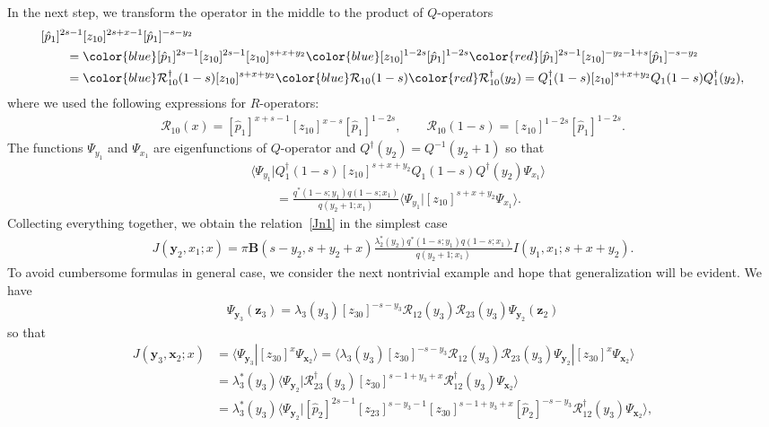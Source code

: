 \documentclass[10pt,a4paper]{amsart}
\newcommand{\blue}{\color{blue}}
\newcommand{\red}{\color{red}}
\numberwithin{equation}{section}
\begin{document}
In the next step, we transform the operator in the middle to
the product of $Q$-operators
\begin{align*}
&
[\hat{p}_1]^{2s-1} [z_{10}]^{2s+x-1}
[\hat{p}_1]^{-s-y_2} \\
&
\qquad{}= {\blue[\hat{p}_1]^{2s-1} [z_{10}]^{2s-1}}
[z_{10}]^{s+x+y_2}
{\blue [z_{10}]^{1-2s} [\hat{p}_1]^{1-2s}}
{\red[\hat{p}_1]^{2s-1} [z_{10}]^{-y_2-1+s}
[\hat{p}_1]^{-s-y_2}} \\
&
\qquad{}= {\blue \mathcal{R}^{\dagger}_{10}(1-s)}
[z_{10}]^{s+x+y_2}
{\blue \mathcal{R}_{10}(1-s)} {\red \mathcal{R}^{\dagger}_{10}(y_2)} =
Q^{\dagger}_1(1-s)
[z_{10}]^{s+x+y_2}
Q_1(1-s) Q^{\dagger}_1(y_2) ,
\end{align*}
where we used the following expressions for $R$-operators:
\begin{align*}
\mathcal{R}_{10}(x) =
[\hat{p}_1]^{x+s-1} [z_{10}]^{x-s} [\hat{p}_1]^{1-2s},\qquad
\mathcal{R}_{10}(1-s) = [z_{10}]^{1-2s} [\hat{p}_1]^{1-2s} .
\end{align*}
The functions $\Psi_{y_1}$ and $\Psi_{x_1}$
are eigenfunctions of $Q$-operator and $Q^{\dagger}(y_2) = Q^{-1}(y_2+1)$ so that
\begin{align*}
&
\bigl\langle \Psi_{y_1}|Q^{\dagger}_1(1-s)
[z_{10}]^{s+x+y_2}
Q_1(1-s) Q^{\dagger}(y_2)
\Psi_{x_{1}}\bigr\rangle \\
& \qquad =
\frac{q^*(1-s;y_1) q(1-s;x_1)}
{q(y_2+1;x_1)}
\langle \Psi_{y_1}|[z_{10}]^{s+x+y_2}
\Psi_{x_{1}}\rangle .
\end{align*}
Collecting everything together, we obtain the relation~\eqref{Jn1}
in the simplest case
\begin{align*}
J(\bm{y}_2,x_{1};x) = \pi \mathbf{B}(s-y_2,s+y_2+x)
\frac{\lambda_2^\ast(y_2) q^*(1-s;y_1) q(1-s;x_1)}
{q(y_2+1;x_1)} I(y_1,x_1;s+x+y_2) .
\end{align*}
To avoid cumbersome formulas in general case, we consider the next nontrivial
example and hope that generalization will be evident.
We have
\begin{align*}
\Psi_{\bm{y}_3}(\bm{z}_3) = \lambda_3(y_3)
[z_{30}]^{-s-y_3} \mathcal{R}_{12}(y_3) \mathcal{R}_{23}(y_3)
\Psi_{\bm{y}_2}(\bm{z}_2)
\end{align*}
so that
\begin{align*}
J(\bm{y}_3,\bm{x}_2;x) & =
\langle \Psi_{\bm{y}_3}|[z_{30}]^{x} \Psi_{\bm{x}_2} \rangle =
\langle \lambda_3(y_3) [z_{30}]^{-s-y_3} \mathcal{R}_{12}(y_3)
\mathcal{R}_{23}(y_3) \Psi_{\bm{y}_2}|
[z_{30}]^{x} \Psi_{\bm{x}_2} \rangle \\
& =
\lambda_3^\ast(y_3)
\bigl\langle \Psi_{\bm{y}_2}|
\mathcal{R}^{\dagger}_{23}(y_3)
[z_{30}]^{s-1+y_3+x} \mathcal{R}^{\dagger}_{12}(y_3) \Psi_{\bm{x}_2} \bigr\rangle \\
& =
\lambda_3^\ast(y_3)
\bigl\langle \Psi_{\bm{y}_2}|
[\hat{p}_2]^{2s-1} [z_{23}]^{s-y_3-1} [z_{30}]^{s-1+y_3+x}
[\hat{p}_2]^{-s-y_3}
\mathcal{R}^{\dagger}_{12}(y_3) \Psi_{\bm{x}_2} \bigr\rangle ,
\end{align*}
\end{document}
